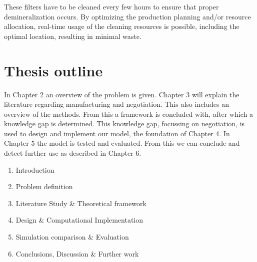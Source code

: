 These filters have to be cleaned every few hours to ensure that proper demineralization occurs. By optimizing the production planning and/or resource allocation, real-time usage of the cleaning resources is possible, including the optimal location, resulting in minimal waste.

\section{Thesis outline}
In Chapter 2 an overview of the problem is given. Chapter 3 will explain the literature regarding manufacturing and negotiation. This also includes an overview of the methods. From this a framework is concluded with, after which a knowledge gap is determined. This knowledge gap, focussing on negotiation, is used to design and implement our model, the foundation of Chapter 4. In Chapter 5 the model is tested and evaluated. From this we can conclude and detect further use as described in Chapter 6.
\begin{enumerate}
	
	\item
	Introduction 
	\item
	Problem definition 
	\item
	Literature Study \& Theoretical framework
	\item
	Design \& Computational Implementation
	\item
	Simulation comparison \& Evaluation
	\item
	Conclusions, Discussion \& Further work
\end{enumerate}

%
%
%
%